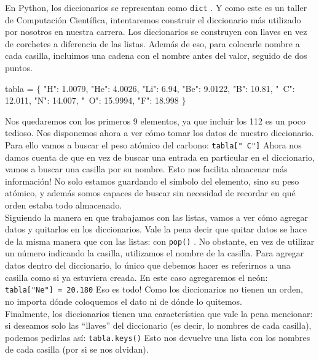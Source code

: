 \documentclass[10pt,letterpaper]{article}
\newcommand{\inlinecode}[1]{
\colorbox{light-gray}{\texttt{#1}}
}
\newenvironment{Code}
{
\begin{lrbox}{\selvestebox}%
\begin{minipage}{\dimexpr\columnwidth-2\fboxsep\relax}
\fontfamily{\ttdefault}\selectfont
}
{\end{minipage}\end{lrbox}%
\begin{center}
\colorbox{light-gray}{\usebox{\selvestebox}}
\end{center}
}
\begin{document}
En Python, los diccionarios se representan como \inlinecode{dict}. Y como este es un taller de Computaci\'on Cient\'ifica, intentaremos construir el diccionario m\'as utilizado por nosotros en nuestra carrera. Los diccionarios se construyen con llaves en vez de corchetes a diferencia de las listas. Adem\'as de eso, para colocarle nombre a cada casilla, incluimos una cadena con el nombre antes del valor, seguido de dos puntos.

\begin{Code}
tabla = $\lbrace$ "H": 1.0079, "He": 4.0026, "Li": 6.94, "Be": 9.0122, "B": 10.81, "\ \hspace{-2mm}C": 12.011, "N": 14.007, "\ \hspace{-2mm}O": 15.9994, "F": 18.998 $\rbrace$
\end{Code}

Nos quedaremos con los primeros 9 elementos, ya que incluir los 112 es un poco tedioso. Nos disponemos ahora a ver c\'omo tomar los datos de nuestro diccionario. Para ello vamos a buscar el peso at\'omico del carbono: \inlinecode{tabla["\ \hspace{-2mm}C"]} Ahora nos damos cuenta de que en vez de buscar una entrada en particular en el diccionario, vamos a buscar una casilla por su nombre. Esto nos facilita almacenar m\'as informaci\'on! No solo estamos guardando el s\'imbolo del elemento, sino su peso at\'omico, y adem\'as somos capaces de buscar sin necesidad de recordar en qu\'e orden estaba todo almacenado.\\

Siguiendo la manera en que trabajamos con las listas, vamos a ver c\'omo agregar datos y quitarlos en los diccionarios. Vale la pena decir que quitar datos se hace de la misma manera que con las listas: con \inlinecode{pop()}. No obstante, en vez de utilizar un n\'umero indicando la casilla, utilizamos el nombre de la casilla. Para agregar datos dentro del diccionario, lo \'unico que debemos hacer es referirnos a una casilla como si ya estuviera creada. En este caso agregaremos el ne\'on: \inlinecode{tabla["Ne"] = 20.180} Eso es todo! Como los diccionarios no tienen un orden, no importa d\'onde coloquemos el dato ni de d\'onde lo quitemos.\\

Finalmente, los diccionarios tienen una caracter\'istica que vale la pena mencionar: si deseamos solo las ``llaves'' del diccionario (es decir, lo nombres de cada casilla), podemos pedirlas as\'i: \inlinecode{tabla.keys()} Esto nos devuelve una lista con los nombres de cada casilla (por si se nos olvidan).\\
\end{document}
